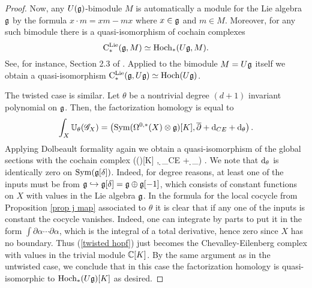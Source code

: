 \begin{proof}
Now, any $U(\mathfrak g)$-bimodule $M$ is automatically a module for the Lie algebra $\mathfrak g$ by the formula $x \cdot m = xm - mx$ where $x \in \mathfrak g$ and $m \in M$.
Moreover, for any such bimodule there is a quasi-isomorphism of cochain complexes 
\[
{\rm C}^{\rm Lie}_*(\mathfrak g, M) \simeq {\rm Hoch}_*(U\mathfrak g, M) .
\]
See, for instance, Section 2.3 of \cite{lectETH}.
Applied to the bimodule $M = U\mathfrak g$ itself we obtain a quasi-isomorphism ${\rm C}^{\rm Lie}_*(\mathfrak g , U\mathfrak g) \simeq {\rm Hoch}(U\mathfrak g)$.

The twisted case is similar. 
Let $\theta$ be a nontrivial degree $(d+1)$ invariant polynomial on $\mathfrak g$. 
Then, the factorization homology is equal to
\[
\int_X \mathbb U_\theta (\mathscr G_X) = \left({\rm Sym}(\Omega^{0,*}(X) \otimes \mathfrak g)[K] , \overline{\partial} + {\rm d}_{CE} + {\rm d}_\theta\right) .
\]
Applying Dolbeault formality again we obtain a quasi-isomorphism of the global sections with the cochain complex
\beqn\label{twisted hopf}
\left(\Sym(\fg[\delta])[K] ,  \d_{CE} + \d_\theta \right) .
\eeqn
We note that ${\rm d}_\theta$ is identically zero on ${\rm Sym}(\mathfrak g[\delta])$. 
Indeed, for degree reasons, at least one of the inputs must be from $\mathfrak g \hookrightarrow \mathfrak g[\delta] = \mathfrak g \oplus \mathfrak g[-1]$, which consists of constant functions on $X$ with values in the Lie algebra $\mathfrak g$. 
In the formula for the local cocycle from Proposition \ref{prop j map} associated to $\theta$ it is clear that if any one of the inputs is constant the cocycle vanishes. 
Indeed, one can integrate by parts to put it in the form $\int \partial \alpha \cdots \partial \alpha$, which is the integral of a total derivative, hence zero since $X$ has no boundary.
Thus (\ref{twisted hopf}) just becomes the Chevalley-Eilenberg complex with values in the trivial module $\mathbb C[K]$. 
By the same argument as in the untwisted case, we conclude that in this case the factorization homology is quasi-isomorphic to ${\rm Hoch}_*(U \mathfrak g)[K]$ as desired.
\end{proof}

